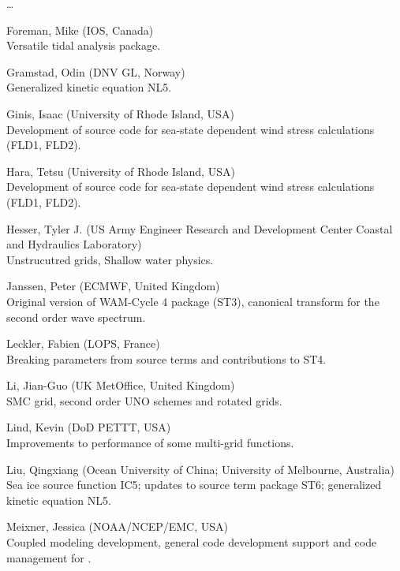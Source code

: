 \begin{list}{\ldots}{ }
\item [Foreman, Mike]  (IOS, Canada) \\
  Versatile tidal analysis package. 
  
\item [Gramstad, Odin] (DNV GL, Norway)\\
  Generalized kinetic equation NL5.

\item [Ginis, Isaac] (University of Rhode Island, USA) \\
  Development of source code for sea-state dependent wind stress calculations (FLD1, FLD2).

\item [Hara, Tetsu] (University of Rhode Island, USA) \\
  Development of source code for sea-state dependent wind stress calculations (FLD1, FLD2).

\item [Hesser, Tyler J.] (US Army Engineer Research and Development Center Coastal and Hydraulics Laboratory) \\
 Unstrucutred grids, Shallow water physics.

\item [Janssen, Peter] (ECMWF, United Kingdom) \\
  Original version of WAM-Cycle 4 package (ST3), canonical transform for the second order wave spectrum.

\item [Leckler, Fabien] (LOPS, France) \\
  Breaking parameters from source terms and contributions to ST4.

\item [Li, Jian-Guo] (UK MetOffice, United Kingdom) \\
  SMC grid, second order UNO schemes and rotated grids.

\item [Lind, Kevin]  (DoD PETTT, USA)\\ 
  Improvements to performance of some multi-grid functions.
 
\item [Liu, Qingxiang] (Ocean University of China; University of Melbourne, Australia)\\
  Sea ice source function IC5; updates to source term package ST6; generalized kinetic equation NL5.

\item [Meixner, Jessica] (NOAA/NCEP/EMC, USA) \\
  Coupled modeling development, general code development support and code management for \ws.
 

\end{list}
